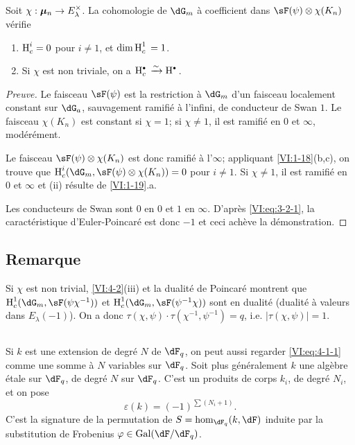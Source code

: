 \begin{proposition_}\label{VI:4-3}
Soit $\chi:{\bm\mu}_n \to E_\lambda^\times$. La cohomologie de $\dG_m$ à 
coefficient dans $\sF(\psi)\otimes \chi(K_n)$ vérifie 
\begin{enumerate}[\indent (i)]
  \item $\operatorname{H}_c^i=0$ pour $i\ne 1$, et $\dim \operatorname{H}_c^1{} = 1$. 
  \item Si $\chi$ est non triviale, on a $\h_c^\bullet{}\iso \h^\bullet{}$. 
\end{enumerate}
\end{proposition_}
\begin{proof}[Preuve]
Le faisceau $\sF(\psi)$ est la restriction à $\dG_m$ d'un faisceau localement 
constant sur $\dG_a$, sauvagement ramifié à l'infini, de conducteur de 
Swan $1$. Le faisceau $\chi(K_n)$ est constant si $\chi=1$; si $\chi\ne 1$, il 
est ramifié en $0$ et $\infty$, modérément. 

Le faisceau $\sF(\psi)\otimes\chi(K_n)$ est donc ramifié à l'$\infty$; 
appliquant \ref{VI:1-18}(b,c), on trouve que 
$\h_c^i(\dG_m,\sF(\psi)\otimes \chi(K_n))=0$ pour $i\ne 1$. Si $\chi\ne 1$, il 
est ramifié en $0$ et $\infty$ et (ii) résulte de \ref{VI:1-19}.a. 

Les conducteurs de Swan sont $0$ en $0$ et $1$ en $\infty$. D'après 
\eqref{VI:eq:3-2-1}, la caractéristique d'Euler-Poincaré est donc $-1$ et 
ceci achève la démonstration. 
\end{proof}





\subsection{Remarque}\label{VI:4-4}

Si $\chi$ est non trivial, \ref{VI:4-2}(iii) et la dualité de Poincaré 
montrent que $\h_c^1(\dG_m,\sF(\psi\chi^{-1}))$ et 
$\h_c^1(\dG_m,\sF(\psi^{-1}\chi))$ sont en dualité (dualité à valeurs 
dans $E_\lambda(-1)$). On a donc 
$\tau(\chi,\psi)\cdot \tau(\chi^{-1},\psi^{-1}) = q$, i.e. 
$|\tau(\chi,\psi)|=1$. 





\subsection{}\label{VI:4-5}

Si $k$ est une extension de degré $N$ de $\dF_q$, on peut aussi regarder 
\eqref{VI:eq:4-1-1} comme une somme à $N$ variables sur $\dF_q$. Soit plus 
généralement $k$ une algèbre étale sur $\dF_q$, de degré $N$ sur 
$\dF_q$. C'est un produits de corps $k_i$, de degré $N_i$, et on pose 
\begin{equation*}\tag{4.5.1}\label{VI:eq:4-5-1}
  \varepsilon(k) = (-1)^{\sum (N_i+1)} \text{.} 
\end{equation*}
C'est la signature de la permutation de $S=\hom_{\dF_q}(k,\dF)$ induite par la 
substitution de Frobenius $\varphi\in \gal(\dF/\dF_q)$. 

